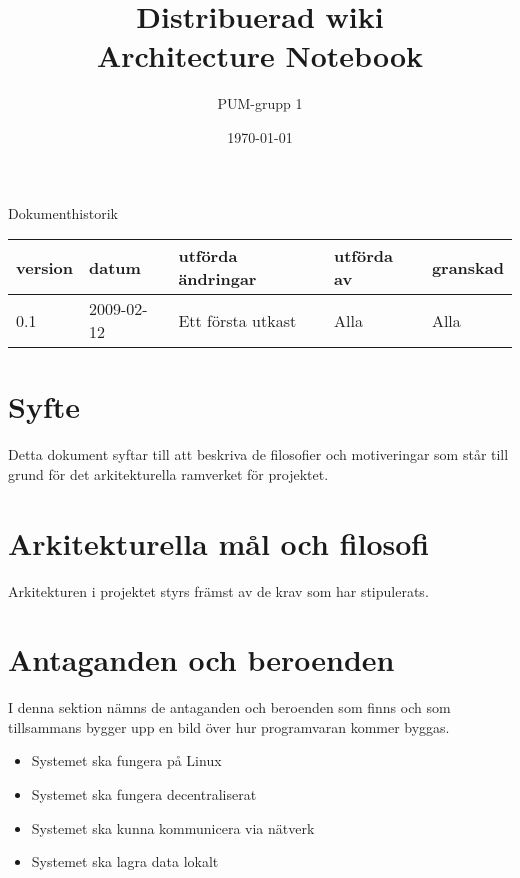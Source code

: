 

\ifpdf
\else
\fi

\title{Distribuerad wiki \\ Architecture Notebook}
\author{PUM-grupp 1}
\date{\today}



\maketitle

\thispagestyle{empty}

\newpage

{\centering \Large{Dokumenthistorik\\}}

\vspace{10pt}
\begin{tabularx}{\textwidth}{ |l|l|X|l|l| }
  \hline
    \textbf{version} & \textbf{datum} & \textbf{utförda ändringar} & \textbf{utförda av} & \textbf{granskad} \\
	\hline 
  0.1 & 2009-02-12 &  Ett första utkast  & Alla & Alla   \\
  \hline
\end{tabularx}

\newpage

\setcounter{tocdepth}{2}
\tableofcontents
\newpage

\section{Syfte}
Detta dokument syftar till att beskriva de filosofier och motiveringar som står till grund för det arkitekturella ramverket för projektet.
\section{Arkitekturella mål och filosofi}
Arkitekturen i projektet styrs främst av de krav som har stipulerats.
\section{Antaganden och beroenden}
I denna sektion nämns de antaganden och beroenden som finns och som tillsammans bygger upp en bild över hur programvaran kommer byggas.
\begin{itemize}
\item Systemet ska fungera på Linux
\item Systemet ska fungera decentraliserat
\item Systemet ska kunna kommunicera via nätverk
\item Systemet ska lagra data lokalt
\end{itemize}
